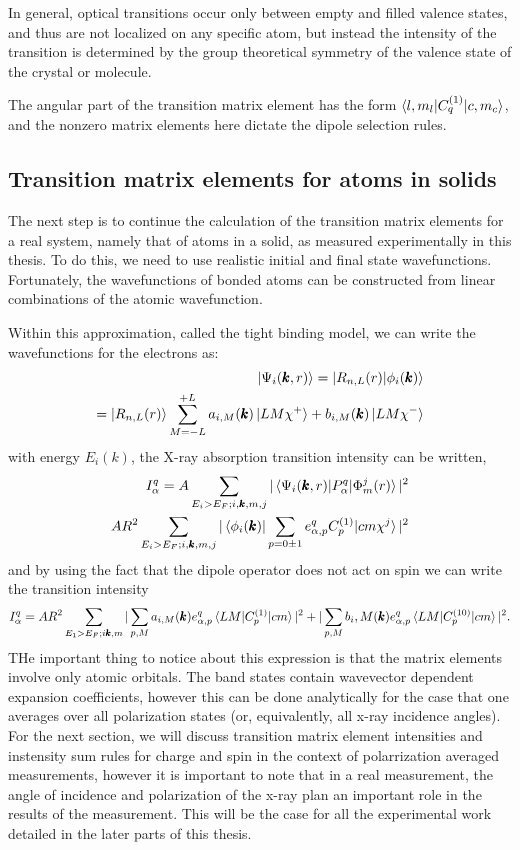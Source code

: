 In general, optical transitions occur only between empty and filled valence states, and thus are not localized on any specific atom, but instead the intensity of the transition is determined by the group theoretical symmetry of the valence state of the crystal or molecule.

The angular part of the transition matrix element has the form $\braket{l,m_l|C_q^{(1)}|c,m_c}$, and the nonzero matrix elements here dictate the dipole selection rules.

\subsection{Transition matrix elements for atoms in solids}

The next step is to continue the calculation of the transition matrix elements for a real system, namely that of atoms in a solid, as measured experimentally in this thesis. To do this, we need to use realistic initial and final state wavefunctions. Fortunately, the wavefunctions of bonded atoms can be constructed from linear combinations of the atomic  wavefunction.

Within this approximation, called the tight binding model, we can write the wavefunctions for the electrons as:
\begin{eqnarray}
\ket{\Psi_i(\pmb{k},r)}=\ket{R_{n,L}(r)|\phi_i(\pmb{k})} \\
= \ket{R_{n,L}(r)}\sum^{+L}_{M=-L}a_{i,M}(\pmb{k})\ket{LM\chi^+}+b_{i,M}(\pmb{k})\ket{LM\chi^-}
\end{eqnarray}
with energy $E_i(k)$, the X-ray absorption transition intensity can be written,
\begin{eqnarray}
I_\alpha^q = A\sum_{E_i>E_F; i ,\pmb{k}, m, j} |\braket{\Psi_i(\pmb{k},r)|P_\alpha^q|\Phi_m^j(r)}|^2 \\
A R^2 \sum_{E_i>E_F;i,\pmb{k},m,j}|\braket{\phi_i(\pmb{k})|\sum_{p=0\pm 1}e^q_{\alpha,p}C_p^{(1)}|cm\chi^j}|^2
\end{eqnarray}
and by using the fact that the dipole operator does not act on spin we can write the transition intensity
\begin{eqnarray}
I_\alpha^q=AR^2\sum_{E_1>E_F; i\pmb{k},m}|\sum_{p,M}a_{i,M}(\pmb{k})e_{\alpha,p}^q\braket{LM|C_p^{(1)}|cm}|^2+|\sum_{p,M}b_i,M(\pmb{k})e^q_{\alpha,p}\braket{LM|C_p^{(10)}|cm}|^2.
\label{transI}
\end{eqnarray}
THe important thing to notice about this expression is that the matrix elements involve only atomic orbitals. The band states contain wavevector dependent expansion coefficients, however this can be done analytically for the case that one averages over all polarization states (or, equivalently, all x-ray incidence angles). For the next section, we will discuss transition matrix element intensities and instensity sum rules for charge and spin in the context of polarrization averaged measurements, however it is important to note that in a real measurement, the angle of incidence and polarization of the x-ray plan an important role in the results of the measurement. This will be the case for all the experimental work detailed in the later parts of this thesis. 

